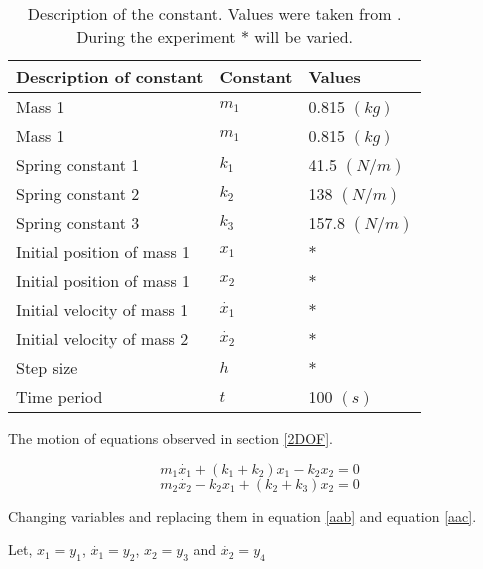 \begin{table}[hbt!]
\begin{center}
    \begin{tabular}{p{6cm}|p{2cm}|p{3cm}}
    \hline
    \textbf{Description of constant} & \textbf{Constant} & \textbf{Values}
    \\
    \hline \hline
    Mass 1 & $m_1$ & 0.815 $(kg)$\\
    Mass 1 & $m_1$ & 0.815 $(kg)$\\
      Spring constant 1  & $k_1$ & 41.5 $(N/m)$\\
      Spring constant 2  & $k_2$  &138 $(N/m)$\\
    Spring constant 3  & $k_3$ & 157.8 $(N/m)$\\
     Initial position of mass 1 & $x_1$ & $*$ \\
     Initial position of mass 1 & $x_2$ & $*$  \\
     Initial velocity of mass 1 & $\dot{x_1}$ & $*$ \\
     Initial velocity of mass 2 & $\dot{x_2}$ & $*$  \\
     Step size & $h$ & $*$  \\
     Time period & $t$ & 100 $(s)$ \\
     \hline
    \end{tabular}
    \caption{Description of the constant. Values were taken from \cite{JETIRRes28:online}. During the experiment $*$ will be varied. }
    \label{tab1}
    \end{center}
\end{table}


The motion of equations observed in section \ref{2DOF}.  

\begin{equation}
\label{aab}
    m_1\dot{x_1}+(k_1+k_2)x_1-k_2x_2=0
\end{equation}
\begin{equation}
\label{aac}
    m_2\dot{x_2}-k_2x_1+(k_2+k_3)x_2 = 0
\end{equation}

Changing variables and replacing them in equation \eqref{aab} and equation \eqref{aac}. 

Let, $x_1 = y_1$, \quad $\dot{x_1} = y_2 $, \quad $x_2 = y_3$ \quad and \quad $\dot{x_2} = y_4$

